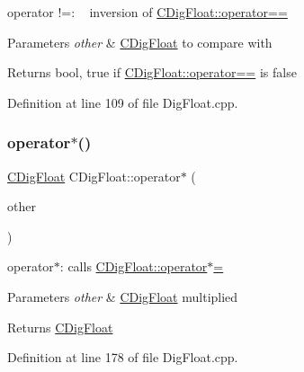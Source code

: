 operator !=\+: ~\newline
 inversion of \hyperlink{classCDigFloat_ad8980d984bf2bab71d15b830fd0180a5}{C\+Dig\+Float\+::operator==} 


\begin{DoxyParams}{Parameters}
{\em other} & \hyperlink{classCDigFloat}{C\+Dig\+Float} to compare with \\
\hline
\end{DoxyParams}
\begin{DoxyReturn}{Returns}
bool, true if \hyperlink{classCDigFloat_ad8980d984bf2bab71d15b830fd0180a5}{C\+Dig\+Float\+::operator==} is false 
\end{DoxyReturn}


Definition at line 109 of file Dig\+Float.\+cpp.

\mbox{\label{classCDigFloat_a79029fee4d38f893d72209e7d6eb89ed}} 
\subsubsection{\texorpdfstring{operator$\ast$()}{operator*()}\hspace{0.1cm}{\footnotesize\ttfamily [1/2]}}
{\footnotesize\ttfamily \hyperlink{classCDigFloat}{C\+Dig\+Float} C\+Dig\+Float\+::operator$\ast$ (\begin{DoxyParamCaption}\item[{const \hyperlink{classCDigFloat}{C\+Dig\+Float} \&}]{other }\end{DoxyParamCaption})}



operator$\ast$\+: calls \hyperlink{classCDigFloat_a9535d47a31a3f1cfa487cc8c567a4a12}{C\+Dig\+Float\+::operator$\ast$=} 


\begin{DoxyParams}{Parameters}
{\em other} & \hyperlink{classCDigFloat}{C\+Dig\+Float} multiplied \\
\hline
\end{DoxyParams}
\begin{DoxyReturn}{Returns}
\hyperlink{classCDigFloat}{C\+Dig\+Float} 
\end{DoxyReturn}


Definition at line 178 of file Dig\+Float.\+cpp.

\mbox{\label{classCDigFloat_aa699c4362ad8acfcd1649f93d805e105}} 
